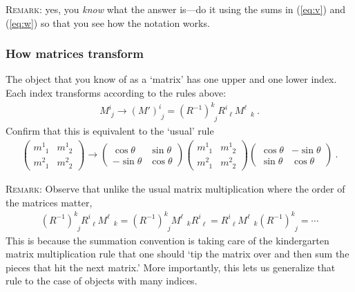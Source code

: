 \documentclass[12pt]{article}
\begin{document}
\textsc{Remark}: yes, you \emph{know} what the answer is---do it using the sums in (\ref{eq:v}) and (\ref{eq:w}) so that you see how the notation works.

\subsubsection{How matrices transform} 

The object that you know of as a `matrix' has one upper and one lower index. Each index transforms according to the rules above:
\begin{align}
	M^i_{\phantom i j} 
	\to (M')^i_{\phantom{i} j} 
	= (R^{-1})^k_{\phantom{k} j} R^i_{\phantom{i}\ell} M^\ell_{\phantom\ell k} \ .
\end{align}
Confirm that this is equivalent to the `usual' rule
\begin{align}
	\begin{pmatrix}
		m^1_{\phantom 1 1} & m^1_{\phantom 1 2}
		\\
		m^2_{\phantom 2 1} & m^2_{\phantom 2 2}
	\end{pmatrix}
	\to 
	\begin{pmatrix}
		\cos \theta & \sin \theta \\
		-\sin \theta & \cos \theta
	\end{pmatrix}
	\begin{pmatrix}
		m^1_{\phantom 1 1} & m^1_{\phantom 1 2}
		\\
		m^2_{\phantom 2 1} & m^2_{\phantom 2 2}
	\end{pmatrix}
	\begin{pmatrix}
		\cos \theta & -\sin \theta \\
		\sin \theta & \cos \theta
	\end{pmatrix} \ .
	\label{eq:rotation:matrix}
\end{align}

\textsc{Remark}: Observe that unlike the usual matrix multiplication where the order of the matrices matter, 
\begin{align*}
(R^{-1})^k_{\phantom{k} j} R^i_{\phantom{i}\ell} M^\ell_{\phantom\ell k}
=
(R^{-1})^k_{\phantom{k} j}  M^\ell_{\phantom\ell k}	R^i_{\phantom{i}\ell}
=
R^i_{\phantom{i}\ell}  M^\ell_{\phantom\ell k} (R^{-1})^k_{\phantom{k} j}
= \cdots
\end{align*}
This is because the summation convention is taking care of the  kindergarten matrix multiplication rule that one should `tip the matrix over and then sum the pieces that hit the next matrix.' More importantly, this lets us generalize that rule to the case of objects with many indices. 
\end{document}
